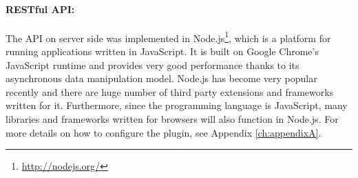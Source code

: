 \begin{figure}[!htbp]
\end{figure}

\paragraph{RESTful API:}
The API on server side was implemented in Node.js\footnote{\url{http://nodejs.org/}}, which is a platform for running applications written in JavaScript. It is built on Google Chrome's JavaScript runtime and provides very good performance thanks to its asynchronous data manipulation model. Node.js has become very popular recently and there are huge number of third party extensions and frameworks written for it. Furthermore, since the programming language is JavaScript, many libraries and frameworks written for browsers will also function in Node.js. For more details on how to configure the plugin, see Appendix \ref{ch:appendixA}.

